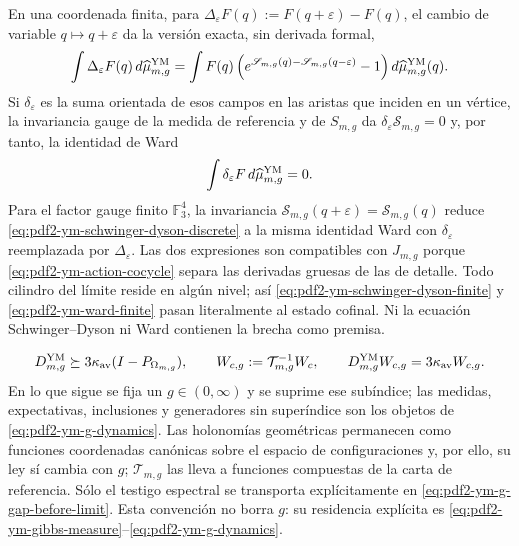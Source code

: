 En una coordenada finita, para
$\Delta_\varepsilon F(q):=F(q+\varepsilon)-F(q)$, el cambio de variable
$q\mapsto q+\varepsilon$ da la versión exacta, sin derivada formal,
\begin{equation}\label{eq:pdf2-ym-schwinger-dyson-discrete}
 \int\Delta_\varepsilon F(q)\,d\widehat\mu_{m,g}^{\rm YM}
 =\int F(q)
  \left(e^{\mathscr S_{m,g}(q)-\mathscr S_{m,g}(q-\varepsilon)}-1\right)
  d\widehat\mu_{m,g}^{\rm YM}(q).
\end{equation}
Si $\delta_\varepsilon$ es la suma orientada de esos campos en las aristas que
inciden en un vértice, la invariancia gauge de la medida de referencia y de
$S_{m,g}$ da $\delta_\varepsilon\mathscr S_{m,g}=0$ y, por tanto, la identidad de Ward
\begin{equation}\label{eq:pdf2-ym-ward-finite}
 \int\delta_\varepsilon F\,d\widehat\mu_{m,g}^{\rm YM}=0.
\end{equation}
Para el factor gauge finito $\mathbb F_3^4$, la invariancia
$\mathscr S_{m,g}(q+\varepsilon)=\mathscr S_{m,g}(q)$ reduce
\eqref{eq:pdf2-ym-schwinger-dyson-discrete} a la misma identidad Ward con
$\delta_\varepsilon$ reemplazada por $\Delta_\varepsilon$.
Las dos expresiones son compatibles con $\widehat J_{m,g}$ porque
\eqref{eq:pdf2-ym-action-cocycle} separa las derivadas gruesas de las de detalle.
Todo cilindro del límite reside en algún nivel; así
\eqref{eq:pdf2-ym-schwinger-dyson-finite} y
\eqref{eq:pdf2-ym-ward-finite} pasan literalmente al estado cofinal. Ni la
ecuación Schwinger--Dyson ni Ward contienen la brecha como premisa.

\begin{equation}\label{eq:pdf2-ym-g-gap-before-limit}
 D_{m,g}^{\rm YM}\succeq3\kappa_{\rm av}
 (I-P_{\Omega_{m,g}}),
 \qquad
 W_{c,g}:=\mathcal T_{m,g}^{-1}W_c,
 \qquad
 D_{m,g}^{\rm YM}W_{c,g}=3\kappa_{\rm av}W_{c,g}.
\end{equation}
En lo que sigue se fija un $g\in(0,\infty)$ y se suprime ese subíndice; las
medidas, expectativas, inclusiones y generadores sin superíndice son los objetos
de \eqref{eq:pdf2-ym-g-dynamics}. Las holonomías geométricas permanecen como
funciones coordenadas canónicas sobre el espacio de configuraciones y, por ello, su
ley sí cambia con $g$; $\mathcal T_{m,g}$ las lleva a funciones compuestas de la
carta de referencia. Sólo el testigo espectral se transporta explícitamente en
\eqref{eq:pdf2-ym-g-gap-before-limit}. Esta convención no borra $g$: su residencia explícita es
\eqref{eq:pdf2-ym-gibbs-measure}--\eqref{eq:pdf2-ym-g-dynamics}.

